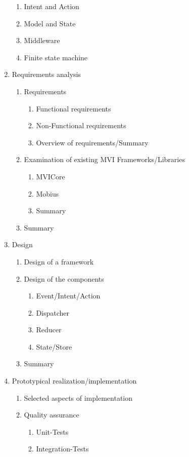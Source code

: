 \begin{enumerate}
\begin{enumerate}
			\item Intent and Action
			\item Model and State
			\item Middleware
			\item Finite state machine
		\end{enumerate}	
	\item Requirements analysis
		\begin{enumerate}
			\item Requirements
		\begin{enumerate}
			\item Functional requirements
			\item Non-Functional requirements
			\item Overview of requirements/Summary
		\end{enumerate}
		\item Examination of existing  MVI Frameworks/Libraries
		\begin{enumerate}
			\item MVICore
			\item Mobius
			\item Summary
		\end{enumerate}
			\item Summary
		\end{enumerate}
	\item Design
	\begin{enumerate}
		\item Design of a framework
		\item Design of the components
		\begin{enumerate}
			\item Event/Intent/Action
			\item Dispatcher
			\item Reducer
			\item State/Store
		\end{enumerate}
		\item Summary
	\end{enumerate}
	\item Prototypical realization/implementation
	\begin{enumerate}
		\item Selected aspects of implementation
		\item Quality assurance
		\begin{enumerate}
			\item Unit-Tests
			\item Integration-Tests

\end{enumerate}
\end{enumerate}
\end{enumerate}
